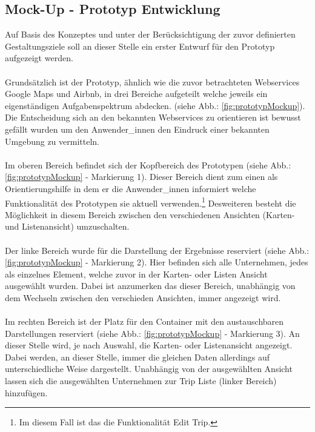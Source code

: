 \documentclass[Bachelorarbeit.tex]{subfiles}
\begin{document}
\subsection{Mock-Up - Prototyp Entwicklung}
\label{chap:entwicklung:sec:design_entwurf:sub:mockUps}
Auf Basis des Konzeptes und unter der Berücksichtigung der zuvor definierten Gestaltungsziele soll an dieser Stelle ein erster Entwurf für den Prototyp aufgezeigt werden.\\
\\
Grundsätzlich ist der Prototyp, ähnlich wie die zuvor betrachteten Webservices Google Maps und Airbnb, in drei Bereiche aufgeteilt welche jeweils ein eigenständigen Aufgabenspektrum abdecken. (siehe Abb.: \ref{fig:prototypMockup}). 
Die Entscheidung sich an den bekannten Webservices zu orientieren ist bewusst gefällt wurden um den Anwender\_innen den Eindruck einer bekannten Umgebung zu vermitteln.\\
\\
Im oberen Bereich befindet sich der Kopfbereich des Prototypen (siehe Abb.: \ref{fig:prototypMockup} - Markierung 1). 
Dieser Bereich dient zum einen als Orientierungshilfe in dem er die Anwender\_innen informiert welche Funktionalität des Prototypen sie aktuell verwenden.\footnote{Im diesem Fall ist das die Funktionalität Edit Trip.}
Desweiteren besteht die Möglichkeit in diesem Bereich zwischen den verschiedenen Ansichten (Karten- und Listenansicht) umzuschalten.\\
\\
Der linke Bereich wurde für die Darstellung der Ergebnisse reserviert (siehe Abb.: \ref{fig:prototypMockup} - Markierung 2). 
Hier befinden sich alle Unternehmen, jedes als einzelnes Element, welche zuvor in der Karten- oder Listen Ansicht ausgewählt wurden.
Dabei ist anzumerken das dieser Bereich, unabhängig von dem Wechseln zwischen den verschieden Ansichten, immer angezeigt wird. \\
\\
Im rechten Bereich ist der Platz für den Container mit den austauschbaren Darstellungen reserviert (siehe Abb.: \ref{fig:prototypMockup} - Markierung 3). 
An dieser Stelle wird, je nach Auswahl, die Karten- oder Listenansicht angezeigt.
Dabei werden, an dieser Stelle, immer die gleichen Daten allerdings auf unterschiedliche Weise dargestellt.
Unabhängig von der ausgewählten Ansicht lassen sich die ausgewählten Unternehmen zur Trip Liste (linker Bereich) hinzufügen.
\end{document}
